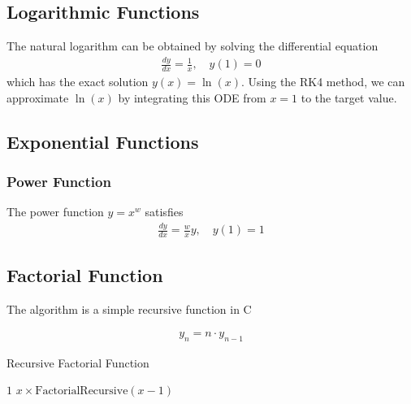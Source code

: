 \documentclass[conference]{IEEEtran}
\begin{document}
\subsection{Logarithmic Functions}

The natural logarithm can be obtained by solving the differential equation \cite{ncert12}
\begin{align}
\frac{dy}{dx} = \frac{1}{x}, \quad y(1)=0
\end{align}
which has the exact solution $y(x)=\ln(x)$. Using the RK4 method, we can approximate $\ln(x)$ by integrating this ODE from $x=1$ to the target value.

\subsection{Exponential Functions}

\subsubsection{Power Function} 
The power function $y=x^w$ \cite{ncert12} satisfies
\begin{align}
\frac{dy}{dx} = \frac{w}{x}y, \quad y(1)=1
\end{align}



\subsection{Factorial Function}

The algorithm is a simple recursive function in C

\begin{align}
y_n = n \cdot y_{n-1}
\end{align}

\cite{GVVSharma}

\begin{algorithm}
\caption{Recursive Factorial Function}
\begin{algorithmic}[1]
        \State \Return $1$
    \Else
        \State \Return $x \times \text{FactorialRecursive}(x-1)$
    \EndIf
\EndFunction
\end{algorithmic}
\end{algorithm}
\end{document}
